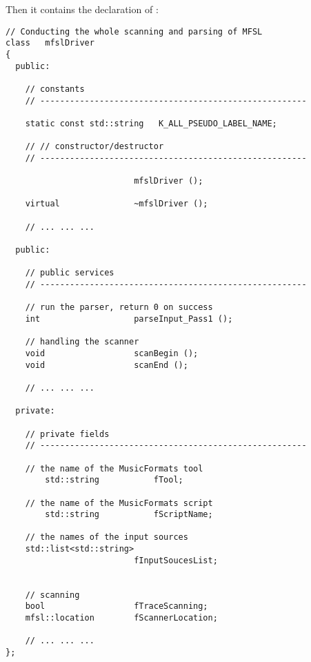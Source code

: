 Then it contains the declaration of :
\begin{lstlisting}[language=CPlusPlus]
// Conducting the whole scanning and parsing of MFSL
class   mfslDriver
{
  public:

    // constants
    // ------------------------------------------------------

    static const std::string   K_ALL_PSEUDO_LABEL_NAME;

    // // constructor/destructor
    // ------------------------------------------------------

                          mfslDriver ();

    virtual               ~mfslDriver ();

	// ... ... ...

  public:

    // public services
    // ------------------------------------------------------

    // run the parser, return 0 on success
    int                   parseInput_Pass1 ();

    // handling the scanner
    void                  scanBegin ();
    void                  scanEnd ();

	// ... ... ...

  private:

    // private fields
    // ------------------------------------------------------

    // the name of the MusicFormats tool
		std::string           fTool;

    // the name of the MusicFormats script
		std::string           fScriptName;

    // the names of the input sources
    std::list<std::string>
                          fInputSoucesList;


    // scanning
    bool                  fTraceScanning;
    mfsl::location        fScannerLocation;

	// ... ... ...
};
\end{lstlisting}

